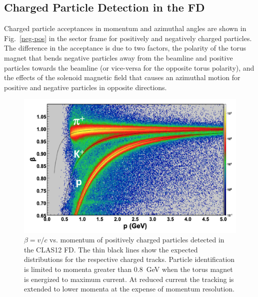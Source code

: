 \documentclass[final,3p,twocolumn]{elsarticle}
\begin{document}
\subsection{Charged Particle Detection in the FD}
 
Charged particle acceptances in momentum and azimuthal angles are shown in Fig.~\ref{neg-pos} in the sector
frame for positively and negatively charged particles. The difference in the acceptance is due to two factors, the
polarity of the torus magnet that bends negative particles away from the beamline and positive particles towards
the beamline (or vice-versa for the opposite torus polarity), and the effects of the solenoid magnetic field that
causes an azimuthal motion for positive and negative particles in opposite directions. 

\begin{figure}[t!]
\centerline{\includegraphics[width=1.0\columnwidth]{FTOF1b_pid.png}}
\caption{$\beta = v/c $ vs. momentum of positively charged particles detected in the CLAS12 FD.
  The thin black lines show the expected distributions for the respective charged tracks. Particle identification
  is limited to momenta greater than 0.8~GeV when the torus magnet is energized to maximum current. At
  reduced current the tracking is extended to lower momenta at the expense of momentum resolution.}
\label{pid}
\end{figure} 
\end{document}
